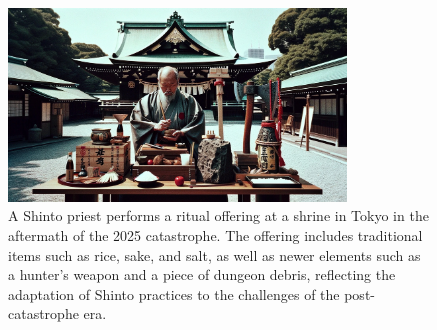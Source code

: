 \documentclass[12pt, a4paper]{article}
\begin{document}
\begin{figure}[ht]
    \centering
    \includegraphics[width=0.8\textwidth]{shrine_offering.jpg}
    \caption{A Shinto priest performs a ritual offering at a shrine in Tokyo in the aftermath of the 2025 catastrophe. The offering includes traditional items such as rice, sake, and salt, as well as newer elements such as a hunter's weapon and a piece of dungeon debris, reflecting the adaptation of Shinto practices to the challenges of the post-catastrophe era.}
    \label{fig:offering}
\end{figure}
\end{document}
